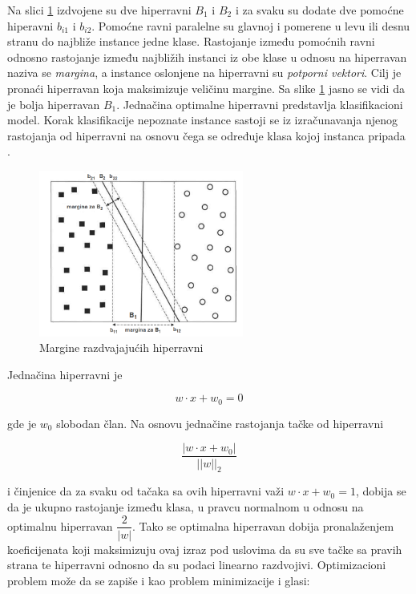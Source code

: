 Na slici \ref{fig:svm2} izdvojene su dve hiperravni $B_1$ i $B_2$ i za svaku su dodate dve pomoćne hiperavni $b_{i1}$ i $b_{i2}$. Pomoćne ravni paralelne su glavnoj i pomerene u levu ili desnu stranu do najbliže instance jedne klase. Rastojanje između pomoćnih ravni odnosno rastojanje između najbližih instanci iz obe klase u odnosu na hiperravan naziva se \textit{margina}, a  instance oslonjene na hiperravni su \textit{potporni vektori}. Cilj je pronaći hiperravan koja maksimizuje veličinu margine. Sa slike \ref{fig:svm2} jasno se vidi da je bolja hiperravan $B_1$. Jednačina optimalne hiperravni predstavlja klasifikacioni model. Korak klasifikacije nepoznate instance sastoji se iz izračunavanja njenog rastojanja od hiperravni na osnovu čega se određuje klasa kojoj instanca pripada \cite{introDM, doktJG}.



\begin{figure}[h]
	\centering
	\includegraphics[width=0.6\textwidth]{Figures/svm2.png}
	\caption{Margine razdvajajućih hiperravni \cite{introDM}}
	\label{fig:svm2}
\end{figure}


Jednačina hiperravni je

$$w \cdot x + w_0 = 0$$

\noindent gde je $w_0$ slobodan član. Na osnovu jednačine rastojanja tačke od hiperravni

$$\dfrac{|w \cdot x + w_0|}{||w||_2}$$

\noindent i činjenice da za svaku od tačaka sa ovih hiperravni važi $w \cdot x + w_0 = 1$, dobija se da je ukupno rastojanje između klasa, u pravcu normalnom u odnosu na optimalnu hiperravan $\dfrac{2}{|w|}$. Tako se optimalna hiperravan dobija pronalaženjem koeficijenata koji maksimizuju ovaj izraz pod uslovima da su sve tačke sa pravih strana te hiperravni odnosno da su podaci linearno razdvojivi. Optimizacioni problem može da se zapiše i kao problem minimizacije i glasi:

